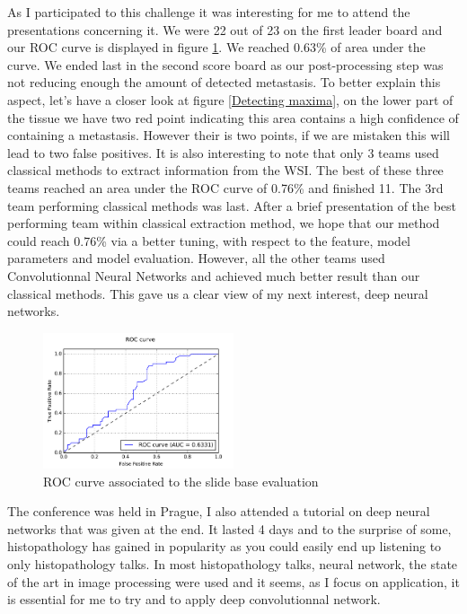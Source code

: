 \documentclass[a4paper,10pt]{article}
\begin{document}
As I participated to this challenge it was interesting for me to attend the presentations concerning it. We were 22 out of 23 on the first leader board and our ROC curve is displayed in figure \ref{Eval: ROC}. We reached 0.63\% of area under the curve. We ended last in the second score board as our post-processing step was not reducing enough the amount of detected metastasis. To better explain this aspect, let's have a closer look at figure \ref{Detecting maxima}, on the lower part of the tissue we have two red point indicating this area contains a high confidence of containing a metastasis. However their is two points, if we are mistaken this will lead to two false positives. It is also interesting to note that only 3 teams used classical methods to extract information from the WSI. The best of these three teams reached an area under the ROC curve of 0.76\% and finished 11. The 3rd team performing classical methods was last. After a brief presentation of the best performing team within classical extraction method, we hope that our method could reach 0.76\% via a better tuning, with respect to the feature, model parameters and model evaluation. However, all the other teams used Convolutionnal Neural Networks and achieved much better result than our classical methods. This gave us a clear view of my next interest, deep neural networks.

\begin{figure}[!ht]
\centering
\includegraphics[width=0.5\textwidth]{ROC.png}
\caption{ROC curve associated to the slide base evaluation}
\label{Eval: ROC}
\end{figure}

The conference was held in Prague, I also attended a tutorial on deep neural networks that was given at the end. It lasted 4 days and to the surprise of some, histopathology has gained in popularity as you could easily end up listening to only histopathology talks. In most histopathology talks, neural network, the state of the art in image processing were used and it seems, as I focus on application, it is essential for me to try and to apply deep convolutionnal network.
\end{document}
